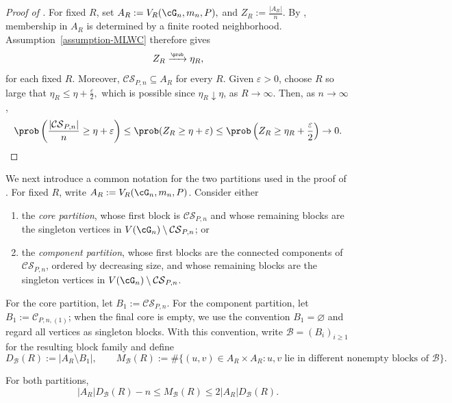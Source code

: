 \documentclass[11pt]{article}
\theoremstyle{plain}
\begin{document}
\begin{proof}[Proof of ]
For fixed $R$, set $A_R:= V_R(\cG_n,m_n,P),$ and $Z_R:=\frac{|A_R|}{n}$.
By , membership in $A_R$ is determined by a
finite rooted neighborhood. Assumption~\ref{assumption-MLWC} therefore gives
\[
Z_R\xrightarrow{\scriptscriptstyle\prob}\eta_R,
\]for each fixed $R$.
Moreover, $\mathcal{CS}_{P,n}\subseteq A_R$ for every $R$. Given
$\varepsilon>0$, choose $R$ so large that
\(
\eta_R\le\eta+\frac{\varepsilon}{2},
\)
which is possible since $\eta_R\downarrow\eta$, as $R\to\infty$. Then, as $n\to\infty$,
\[
\prob\left(\frac{|\mathcal{CS}_{P,n}|}{n}\ge\eta+\varepsilon\right)
\le \prob(Z_R\ge\eta+\varepsilon)\le \prob\left(Z_R\ge\eta_R+\frac{\varepsilon}{2}\right)
\to 0.
\]
\end{proof}

We next introduce a common notation for the two partitions used in the proof of . For fixed $R$, write $A_R:= V_R(\cG_n,m_n,P)$. Consider either
\begin{enumerate}[label=(\roman*)]
    \item the \emph{core partition}, whose first block is $\mathcal{CS}_{P,n}$ and whose remaining blocks are the singleton vertices in $V(\cG_n)\setminus\mathcal{CS}_{P,n}$; or
    \item the \emph{component partition}, whose first blocks are the connected components of $\mathcal{CS}_{P,n}$, ordered by decreasing size, and whose remaining blocks are the singleton vertices in $V(\cG_n)\setminus\mathcal{CS}_{P,n}$.
\end{enumerate}
For the core partition, let $B_1:=\mathcal{CS}_{P,n}$. For the component
partition, let $B_1:=\mathcal C_{P,n,(1)}$; when the final core is empty, we
use the convention $B_1=\varnothing$ and regard all vertices as singleton
blocks. With this convention, write $\mathcal B=(B_i)_{i\ge1}$ for the
resulting block family and define
\[
D_{\mathcal{B}}(R):=|A_R\setminus B_1|,
\qquad
M_{\mathcal{B}}(R):=\#\{(u,v)\in A_R \times A_R:u,v\text{ lie in different nonempty blocks of }\mathcal{B}\}.
\]

\begin{lemma}\label{lem:partition-estimate}
For both partitions,
\[
|A_R|D_{\mathcal{B}}(R)-n
\le M_{\mathcal{B}}(R)
\le 2|A_R|D_{\mathcal{B}}(R).
\]
\end{lemma}
\end{document}
